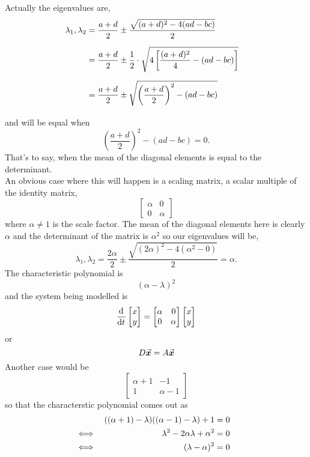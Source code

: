 \documentclass[../MathsNotesBase.tex]{subfiles}
\begin{document}
{		Actually the eigenvalues are,
		\[\begin{aligned}
			\lambda_1,\lambda_2 &= \frac{a+d}{2} \pm \frac{\sqrt{(a+d)^2 - 4(ad - bc)}}{2} \nn
			&= \frac{a+d}{2} \pm \frac{1}{2} \cdot \sqrt{ 4 \left[ \frac{(a+d)^2}{4} - (ad - bc) \right] } &\sidecomment{} \nn
			&= \frac{a+d}{2} \pm \sqrt{ \left(\frac{a+d}{2}\right)^2 - (ad - bc) } &\sidecomment{} \nn
		\end{aligned}\]
		and will be equal when
		\[ \left(\frac{a+d}{2}\right)^2 - (ad - bc) = 0. \]
		That's to say, when the mean of the diagonal elements is equal to the determinant.\\
		
		An obvious case where this will happen is a scaling matrix, a scalar multiple of the identity matrix,
		\[
			\begin{bmatrix}
				\alpha & 0\\
				0 & \alpha
			\end{bmatrix} 
		\]
		where ${ \alpha \neq 1 }$ is the scale factor. The mean of the diagonal elements here is clearly $\alpha$ and the determinant of the matrix is $\alpha^2$ so our eigenvalues will be,
		\[ \lambda_1,\lambda_2 = \frac{2\alpha}{2} \pm \frac{\sqrt{(2\alpha)^2 - 4(\alpha^2 - 0)}}{2} = \alpha. \]
		The characteristic polynomial is
		\[ (\alpha - \lambda)^2 \]
		and the system being modelled is
		\[
			\dod{}{t} \begin{bmatrix}x\\ y\end{bmatrix} =
						\begin{bmatrix}
							\alpha & 0\\
							0 & \alpha
						\end{bmatrix} \begin{bmatrix}x\\ y\end{bmatrix}
		\]
		or
		\[ D \vec{\bm{x}} = A \vec{\bm{x}} \]
		Another case would be
		\[
			\begin{bmatrix}
				\alpha + 1 & -1\\
				1 & \alpha - 1
			\end{bmatrix} 
		\]
		so that the characterstic polynomial comes out as
		\[\begin{aligned}
			&& ((\alpha + 1) - \lambda)((\alpha - 1) - \lambda) + 1 &= 0 \\
			&\iff & \lambda^2 - 2\alpha\lambda + \alpha^2 &= 0 &\sidecomment{} \\
			&\iff & (\lambda - \alpha)^2 &= 0 &\sidecomment{} \\

\end{aligned}\]}
\end{document}
